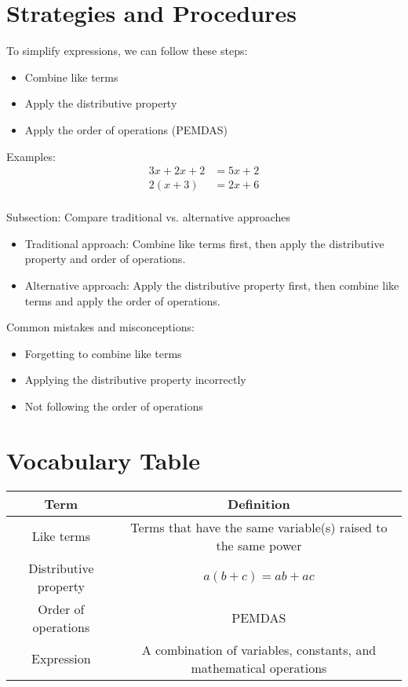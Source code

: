 \documentclass{article}
\begin{document}
\section{Strategies and Procedures}
To simplify expressions, we can follow these steps:
\begin{itemize}
\item Combine like terms
\item Apply the distributive property
\item Apply the order of operations (PEMDAS)
\end{itemize}

Examples:
\begin{align*}
3x + 2x + 2 &= 5x + 2 \\
2(x + 3) &= 2x + 6 \\
\end{align*}

Subsection: Compare traditional vs. alternative approaches
\begin{itemize}
\item Traditional approach: Combine like terms first, then apply the distributive property and order of operations.
\item Alternative approach: Apply the distributive property first, then combine like terms and apply the order of operations.
\end{itemize}

Common mistakes and misconceptions:
\begin{itemize}
\item Forgetting to combine like terms
\item Applying the distributive property incorrectly
\item Not following the order of operations
\end{itemize}

\section{Vocabulary Table}
\begin{center}
\begin{tabular}{|c|c|}
\hline Term & Definition \\
\hline Like terms & Terms that have the same variable(s) raised to the same power \\
\hline Distributive property & $a(b + c) = ab + ac$ \\
\hline Order of operations & PEMDAS \\
\hline Expression & A combination of variables, constants, and mathematical operations \\
\hline
\end{tabular}
\end{center}
\end{document}
